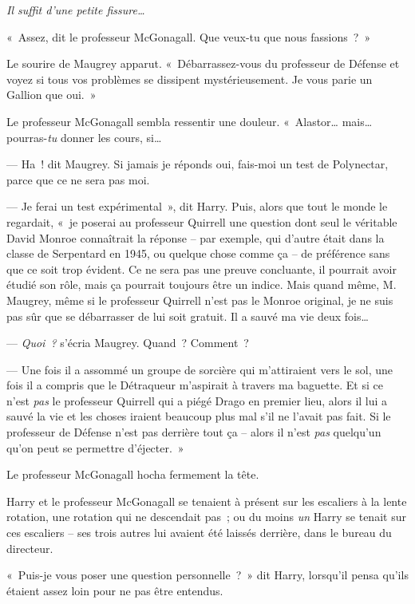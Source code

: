 \emph{Il suffit d'une petite fissure…}

«~Assez, dit le professeur McGonagall.
Que veux-tu que nous fassions~?~»

Le sourire de Maugrey apparut.
«~Débarrassez-vous du professeur de Défense et voyez si tous vos problèmes se dissipent mystérieusement.
Je vous parie un Gallion que oui.~»

Le professeur McGonagall sembla ressentir une douleur.
«~Alastor… mais… pourras-\emph{tu} donner les cours, si…

--- Ha~! dit Maugrey.
Si jamais je réponds oui, fais-moi un test de Polynectar, parce que ce ne sera pas moi.

--- Je ferai un test expérimental~», dit Harry.
Puis, alors que tout le monde le regardait, «~je poserai au professeur Quirrell une question dont seul le véritable David Monroe connaîtrait la réponse -- par exemple, qui d'autre était dans la classe de Serpentard en 1945, ou quelque chose comme ça -- de préférence sans que ce soit trop évident.
Ce ne sera pas une preuve concluante, il pourrait avoir étudié son rôle, mais ça pourrait toujours être un indice.
Mais quand même, M. Maugrey, même si le professeur Quirrell n'est pas le Monroe original, je ne suis pas sûr que se débarrasser de lui soit gratuit.
Il a sauvé ma vie deux fois…

--- \emph{Quoi~?} s'écria Maugrey.
Quand~? Comment~?

--- Une fois il a assommé un groupe de sorcière qui m'attiraient vers le sol, une fois il a compris que le Détraqueur m'aspirait à travers ma baguette.
Et si ce n'est \emph{pas} le professeur Quirrell qui a piégé Drago en premier lieu, alors il lui a sauvé la vie et les choses iraient beaucoup plus mal s'il ne l'avait pas fait.
Si le professeur de Défense n'est pas derrière tout ça -- alors il n'est \emph{pas} quelqu'un qu'on peut se permettre d'éjecter.~»

Le professeur McGonagall hocha fermement la tête.


Harry et le professeur McGonagall se tenaient à présent sur les escaliers à la lente rotation, une rotation qui ne descendait pas~; ou du moins \emph{un} Harry se tenait sur ces escaliers -- ses trois autres lui avaient été laissés derrière, dans le bureau du directeur.

«~Puis-je vous poser une question personnelle~?~»
dit Harry, lorsqu'il pensa qu'ils étaient assez loin pour ne pas être entendus.

